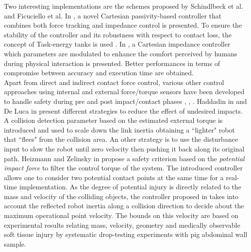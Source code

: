 Two interesting implementations are the schemes proposed by Schindlbeck et al. and Ficuciello et al. In \cite{schindlbeck2015unified}, a novel Cartesian passivity-based controller that combines both force tracking and impedance control is presented. To ensure the stability of the controller and its robustness with respect to contact loss, the concept of Task-energy tanks is used \cite{ferraguti2013tank}. In \cite{ficuciello2015variable}, a Cartesian impedance controller which parameters are modulated to enhance the comfort perceived by humans during physical interaction is presented. Better performances in terms of compromise between accuracy and execution time are obtained.  \\
Apart from direct and indirect contact force control, various other control  approaches using internal and external force/torque sensors have been developed to handle safety during pre and post impact/contact phases \cite{ebert2002safe}, \cite{lumelsky1993real}, \cite{ikuta2003safety}. Haddadin in \cite{haddadin2008collision} and De Luca in \cite{de2006collision} present different strategies to reduce the effect of undesired impacts. A collision detection parameter based on the estimated external torque is introduced and used to scale down the link inertia obtaining a ``lighter" robot that ``flees" from the collision area. An other strategy is to use the disturbance input to slow the robot until zero velocity then pushing it back along its original path. Heizmann and Zelinsky in \cite{heinzmann2003quantitative} propose a safety criterion based on the \textit{potential impact force} to filter the control torque of the system. The introduced controller allows one to  consider two potential contact points at the same time for a real-time implementation.
As the degree of potential injury is directly related to the mass and velocity of the colliding objects, the controller proposed in \cite{haddadin2012truly} takes into account the reflected robot inertia along a collision direction to decide about the maximum operational point velocity. The bounds on this velocity are based on experimental results relating mass, velocity, geometry and medically observable soft tissue injury by systematic drop-testing experiments with pig abdominal wall sample.
